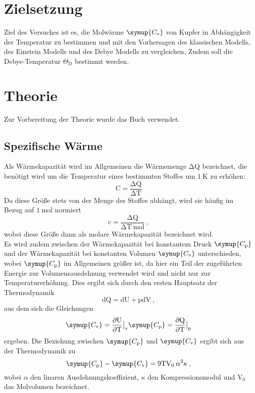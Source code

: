 \section{Zielsetzung}
Ziel des Versuches ist es, die Molwärme $\symup{C_{\text{v}}}$ von Kupfer in Abhängigkeit der
Temperatur zu bestimmen und mit den Vorhersagen des klassischen Modells, des Einstein
Modells und des Debye Modells zu vergleichen. Zudem soll die Debye-Temperatur
$\Theta_{\text{D}}$ bestimmt werden.

\section{Theorie}
Zur Vorbereitung der Theorie wurde das Buch \cite{fkp} verwendet.
\subsection{Spezifische Wärme}
Als Wärmekapazität wird im Allgemeinen die Wärmemenge $\increment \text{Q}$ bezeichnet,
die benötigt wird um
die Temperatur eines
bestimmten Stoffes um $\SI{1}{\kelvin}$ zu erhöhen:
\begin{equation}
  \text{C} = \frac{\increment \text{Q}}{\increment \text{T}}
  \label{eqn:warm}
\end{equation}
Da diese Größe stets von der Menge des Stoffes abhängt, wird sie häufig im
Bezug auf $\SI{1}{\mol}$ normiert
\begin{equation}
  \text{c} = \frac{\increment \text{Q}}{\increment \text{T} \: \text{mol}} \: ,
  \label{eqn:cmol}
\end{equation}
wobei diese Größe dann als molare Wärmekapazität bezeichnet wird.  \\
Es wird zudem zwischen der Wärmekapazität bei konstantem Druck $\symup{C_{\text{p}}}$ und der Wärmekapazität bei
konstanten Volumen $\symup{C_{\text{v}}}$ unterschieden, wobei $\symup{C_{\text{p}}}$
im Allgemeinen größer ist, da hier ein Teil der zugeführten Energie zur Volumensausdehnung verwendet
wird und nicht nur zur Temperaturerhöhung.
Dies ergibt sich durch den ersten Hauptsatz der Thermodynamik
\begin{equation}
  \text{dQ} = \text{dU} + \text{pdV} \: ,
  \label{eqn:hs1}
\end{equation}
aus dem sich die Gleichungen
\begin{equation}
  \symup{C_{\text{v}}} = \frac{\partial\text{U}}{\partial\text{T}}\bigr|_{\text{v}} \\
  \symup{C_{\text{p}}} = \frac{\partial\text{Q}}{\partial\text{T}}\bigr|_{\text{p}}
  \label{eqn:cc}
\end{equation}
ergeben. Die Beziehung zwischen $\symup{C_{\text{p}}}$ und $\symup{C_{\text{v}}}$
ergibt sich aus der Thermodynamik zu
\begin{equation}
  \symup{C_{\text{p}}}-\symup{C_{\text{v}}}=9 \text{TV}_0\:\alpha^2\kappa \: ,
  \label{eqn:cpcv}
\end{equation}
wobei $\alpha$ den linaren Ausdehnungskoeffizient, $\kappa$ den Kompressionsmodul und
$\text{V}_0$ das Molvolumen bezeichnet.

